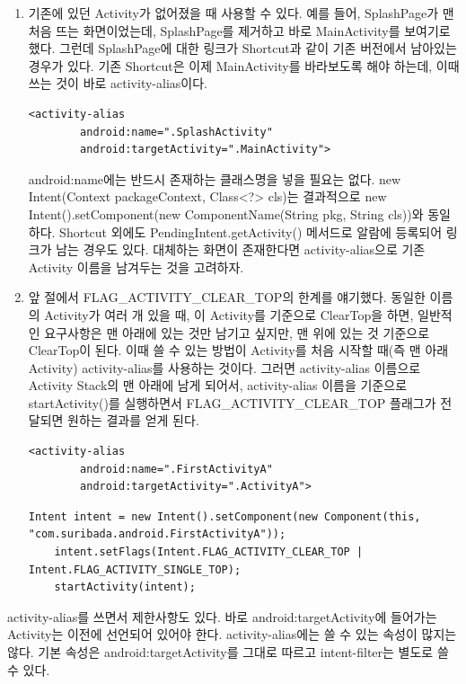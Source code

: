 \begin{enumerate}
\item 기존에 있던 Activity가 없어졌을 때 사용할 수 있다.
예를 들어, SplashPage가 맨 처음 뜨는 화면이었는데, SplashPage를 제거하고 바로 MainActivity를 보여기로 했다.
그런데 SplashPage에 대한 링크가 Shortcut과 같이 기존 버전에서 남아있는 경우가 있다.
기존 Shortcut은 이제 MainActivity를 바라보도록 해야 하는데, 이때 쓰는 것이 바로 activity-alias이다.
\begin{lstlisting}[frame=single]
	<activity-alias
    	android:name=".SplashActivity"
        android:targetActivity=".MainActivity">
\end{lstlisting}
android:name에는 반드시 존재하는 클래스명을 넣을 필요는 없다. new Intent(Context packageContext, Class<?> cls)는 결과적으로 new Intent().setComponent(new ComponentName(String pkg, String cls))와 동일하다. 
Shortcut 외에도 PendingIntent.getActivity() 메서드로 알람에 등록되어 링크가 남는 경우도 있다. 대체하는 화면이 존재한다면 activity-alias으로 기존 Activity 이름을 남겨두는 것을 고려하자.
\item 앞 절에서 FLAG\_ACTIVITY\_CLEAR\_TOP의 한계를 얘기했다. 동일한 이름의 Activity가 여러 개 있을 때, 이 Activity를 기준으로 ClearTop을 하면, 일반적인 요구사항은 맨 아래에 있는 것만 남기고 싶지만, 맨 위에 있는 것 기준으로 ClearTop이 된다. 이때 쓸 수 있는 방법이 Activity를 처음 시작할 때(즉 맨 아래 Activity) activity-alias를 사용하는 것이다. 그러면 activity-alias 이름으로  Activity Stack의 맨 아래에 남게 되어서, activity-alias 이름을 기준으로 startActivity()를 실행하면서 FLAG\_ACTIVITY\_CLEAR\_TOP 플래그가 전달되면 원하는 결과를 얻게 된다.
\begin{lstlisting}[frame=single]
	<activity-alias
    	android:name=".FirstActivityA"
        android:targetActivity=".ActivityA">
\end{lstlisting}
\begin{lstlisting}[frame=single]
	Intent intent = new Intent().setComponent(new Component(this, "com.suribada.android.FirstActivityA"));
	intent.setFlags(Intent.FLAG_ACTIVITY_CLEAR_TOP | Intent.FLAG_ACTIVITY_SINGLE_TOP);
	startActivity(intent);
\end{lstlisting}
\end{enumerate} 

activity-alias를 쓰면서 제한사항도 있다.
바로 android:targetActivity에 들어가는 Activity는 이전에 선언되어 있어야 한다. 
activity-alias에는 쓸 수 있는 속성이 많지는 않다. 기본 속성은 android:targetActivity를 그대로 따르고 intent-filter는 별도로 쓸 수 있다.
